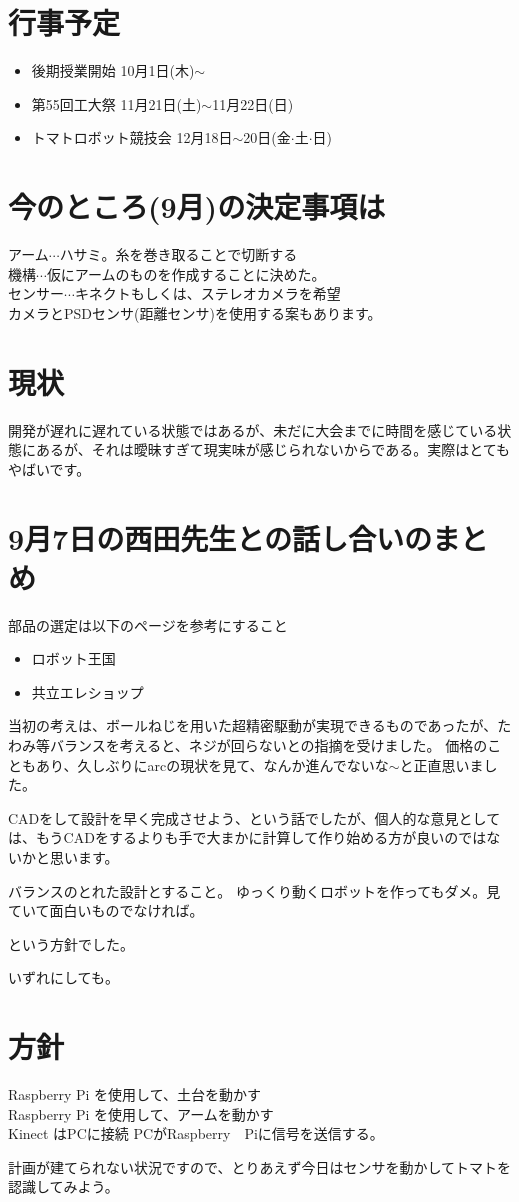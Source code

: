 \section{行事予定}
\begin{itemize}
\item 後期授業開始
10月1日(木)$\sim$
\item 第55回工大祭
11月21日(土)$\sim$11月22日(日)
\item トマトロボット競技会
12月18日$\sim$20日(金$\cdot$土$\cdot$日)
\end{itemize}

\section{今のところ(9月)の決定事項は}
アーム$\cdots$ハサミ。糸を巻き取ることで切断する\\
機構$\cdots$仮にアームのものを作成することに決めた。\\
センサー$\cdots$キネクトもしくは、ステレオカメラを希望\\
カメラとPSDセンサ(距離センサ)を使用する案もあります。\\
\section{現状}
開発が遅れに遅れている状態ではあるが、未だに大会までに時間を感じている状態にあるが、それは曖昧すぎて現実味が感じられないからである。実際はとてもやばいです。

\section{9月7日の西田先生との話し合いのまとめ}
部品の選定は以下のページを参考にすること
\begin{itemize}
\item ロボット王国
\item 共立エレショップ
\end{itemize}

当初の考えは、ボールねじを用いた超精密駆動が実現できるものであったが、たわみ等バランスを考えると、ネジが回らないとの指摘を受けました。
価格のこともあり、久しぶりにarcの現状を見て、なんか進んでないな$\sim$と正直思いました。

CADをして設計を早く完成させよう、という話でしたが、個人的な意見としては、もうCADをするよりも手で大まかに計算して作り始める方が良いのではないかと思います。

バランスのとれた設計とすること。
ゆっくり動くロボットを作ってもダメ。見ていて面白いものでなければ。

という方針でした。

いずれにしても。

\section{方針}
Raspberry Pi を使用して、土台を動かす\\
Raspberry Pi を使用して、アームを動かす\\
Kinect はPCに接続
PCがRaspberry　Piに信号を送信する。

計画が建てられない状況ですので、とりあえず今日はセンサを動かしてトマトを認識してみよう。
